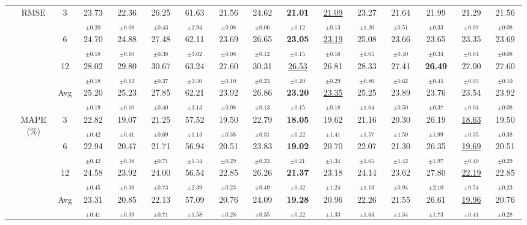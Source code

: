 \begin{table}[t]
{\begin{tabular}{ccc|ccc|cccc|cccc|cc}
\cmidrule(lr){2-16}
 & \multirow{4}{*}{RMSE} & 3 & 23.73$_{\pm0.20}$ & 22.36$_{\pm0.08}$ & 26.25$_{\pm0.43}$ & 61.63$_{\pm2.94}$ & 21.56$_{\pm0.08}$ & 24.62$_{\pm0.06}$ & \textbf{21.01$_{\pm0.12}$} & \underline{21.09$_{\pm0.13}$} & 23.27$_{\pm1.20}$ & 21.64$_{\pm0.51}$ & 21.99$_{\pm0.33}$ & 21.29$_{\pm0.07}$ & 21.56$_{\pm0.08}$ \\
 &  & 6 & 24.70$_{\pm0.18}$ & 24.88$_{\pm0.10}$ & 27.48$_{\pm0.38}$ & 62.11$_{\pm3.02}$ & 23.69$_{\pm0.08}$ & 26.65$_{\pm0.12}$ & \textbf{23.05$_{\pm0.15}$} & \underline{23.19$_{\pm0.16}$} & 25.08$_{\pm1.05}$ & 23.66$_{\pm0.40}$ & 23.65$_{\pm0.34}$ & 23.35$_{\pm0.04}$ & 23.69$_{\pm0.08}$ \\
 &  & 12 & 28.02$_{\pm0.18}$ & 29.80$_{\pm0.13}$ & 30.67$_{\pm0.37}$ & 63.24$_{\pm3.50}$ & 27.60$_{\pm0.10}$ & 30.31$_{\pm0.23}$ & \underline{26.53$_{\pm0.20}$} & 26.81$_{\pm0.29}$ & 28.33$_{\pm0.80}$ & 27.41$_{\pm0.62}$ & \textbf{26.49$_{\pm0.45}$} & 27.00$_{\pm0.05}$ & 27.60$_{\pm0.10}$ \\
 &  & Avg & 25.20$_{\pm0.19}$ & 25.23$_{\pm0.10}$ & 27.85$_{\pm0.40}$ & 62.21$_{\pm3.13}$ & 23.92$_{\pm0.08}$ & 26.86$_{\pm0.13}$ & \textbf{23.20$_{\pm0.15}$} & \underline{23.35$_{\pm0.18}$} & 25.25$_{\pm1.04}$ & 23.89$_{\pm0.50}$ & 23.76$_{\pm0.37}$ & 23.54$_{\pm0.04}$ & 23.92$_{\pm0.08}$ \\
\cmidrule(lr){2-16}
 & \multirow{4}{*}{MAPE (\%)} & 3 & 22.82$_{\pm0.42}$ & 19.07$_{\pm0.41}$ & 21.25$_{\pm0.69}$ & 57.52$_{\pm1.13}$ & 19.50$_{\pm0.38}$ & 22.79$_{\pm0.31}$ & \textbf{18.05$_{\pm0.22}$} & 19.62$_{\pm1.41}$ & 21.16$_{\pm1.57}$ & 20.30$_{\pm1.59}$ & 26.19$_{\pm1.99}$ & \underline{18.63$_{\pm0.35}$} & 19.50$_{\pm0.38}$ \\
 &  & 6 & 22.94$_{\pm0.42}$ & 20.47$_{\pm0.38}$ & 21.71$_{\pm0.71}$ & 56.94$_{\pm1.54}$ & 20.51$_{\pm0.29}$ & 23.83$_{\pm0.33}$ & \textbf{19.02$_{\pm0.21}$} & 20.70$_{\pm1.34}$ & 22.07$_{\pm1.65}$ & 21.30$_{\pm1.42}$ & 26.35$_{\pm1.97}$ & \underline{19.69$_{\pm0.40}$} & 20.51$_{\pm0.29}$ \\
 &  & 12 & 24.58$_{\pm0.45}$ & 23.92$_{\pm0.38}$ & 24.00$_{\pm0.73}$ & 56.54$_{\pm2.39}$ & 22.85$_{\pm0.23}$ & 26.26$_{\pm0.49}$ & \textbf{21.37$_{\pm0.32}$} & 23.18$_{\pm1.24}$ & 24.14$_{\pm1.73}$ & 23.62$_{\pm0.94}$ & 27.80$_{\pm2.10}$ & \underline{22.19$_{\pm0.54}$} & 22.85$_{\pm0.23}$ \\
 &  & Avg & 23.31$_{\pm0.41}$ & 20.85$_{\pm0.39}$ & 22.13$_{\pm0.71}$ & 57.09$_{\pm1.58}$ & 20.76$_{\pm0.28}$ & 24.09$_{\pm0.35}$ & \textbf{19.28$_{\pm0.22}$} & 20.96$_{\pm1.33}$ & 22.26$_{\pm1.64}$ & 21.55$_{\pm1.34}$ & 26.61$_{\pm1.73}$ & \underline{19.96$_{\pm0.41}$} & 20.76$_{\pm0.28}$ \\

\end{tabular}}
\end{table}

